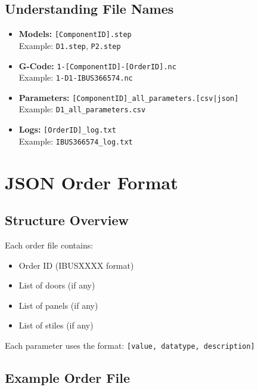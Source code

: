 \documentclass[11pt,letterpaper]{article}
\begin{document}
\subsection{Understanding File Names}

\begin{itemize}
    \item \textbf{Models:} \texttt{[ComponentID].step}\\
    Example: \texttt{D1.step}, \texttt{P2.step}
    
    \item \textbf{G-Code:} \texttt{1-[ComponentID]-[OrderID].nc}\\
    Example: \texttt{1-D1-IBUS366574.nc}
    
    \item \textbf{Parameters:} \texttt{[ComponentID]\_all\_parameters.[csv|json]}\\
    Example: \texttt{D1\_all\_parameters.csv}
    
    \item \textbf{Logs:} \texttt{[OrderID]\_log.txt}\\
    Example: \texttt{IBUS366574\_log.txt}
\end{itemize}

\section{JSON Order Format}
\label{sec:json_format}

\subsection{Structure Overview}

Each order file contains:
\begin{itemize}
    \item Order ID (IBUSXXXX format)
    \item List of doors (if any)
    \item List of panels (if any)
    \item List of stiles (if any)
\end{itemize}

Each parameter uses the format: \texttt{[value, datatype, description]}

\subsection{Example Order File}
\end{document}
